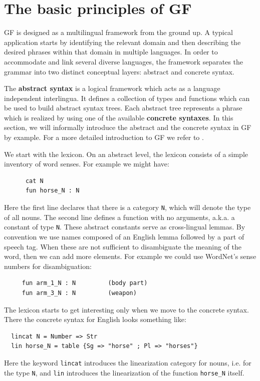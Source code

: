 \documentclass[output=paper]{LSP/langsci}
\begin{document}
\section{The basic principles of GF}

GF is designed as a multilingual framework from the ground up.
A typical application starts by identifying the relevant
domain and then describing the desired phrases within that domain
in multiple languages. In order to accommodate and link several
diverse languages, the framework separates the grammar into two distinct
conceptual layers: abstract and concrete syntax.

The \textbf{abstract syntax} is a logical framework which acts as a language independent interlingua. It defines a collection of types and functions which can be used to build abstract syntax trees. Each abstract tree represents a phrase which is realized by using one of the available \textbf{concrete syntaxes}. In this section, we will informally introduce the abstract and the concrete syntax in GF by example. For a more detailed introduction to GF we refer to \cite{ranta-2011}.

We start with the lexicon. On an abstract level, the lexicon consists of a simple inventory of word senses. For example we might have:
\begin{verbatim}
      cat N
      fun horse_N : N
\end{verbatim}
Here the first line declares that there is a category \verb=N=, which will denote the type of all nouns. The second line defines a function with no arguments, a.k.a. a constant of type \verb=N=. These abstract constants serve as cross-lingual lemmas. By convention we use names composed of an English lemma followed by a part of speech tag. When these are not sufficient to disambiguate the meaning of the word, then we can add more elements. For example we could use WordNet’s sense numbers for disambiguation:
\begin{verbatim}
     fun arm_1_N : N         (body part)
     fun arm_3_N : N         (weapon)
\end{verbatim}

The lexicon starts to get interesting only when we move to 
the concrete syntax. There the concrete syntax for English 
looks something like:
\begin{verbatim}
  lincat N = Number => Str
  lin horse_N = table {Sg => "horse" ; Pl => "horses"}
\end{verbatim}
Here the keyword \verb=lincat= introduces the linearization category 
for nouns, i.e. for the type \verb=N=, and \verb=lin= introduces 
the linearization of the function \verb=horse_N= itself.
\end{document}

